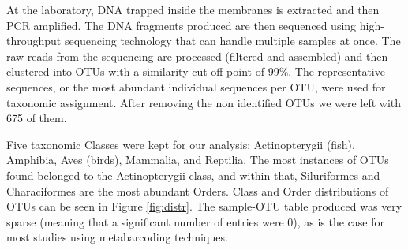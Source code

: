 At the laboratory, DNA trapped inside the membranes is extracted and then PCR amplified. The DNA fragments produced are then sequenced using high-throughput sequencing technology that can handle multiple samples at once. The raw reads from the sequencing are processed (filtered and assembled) and then clustered into OTUs with a similarity cut-off point of 99\%. The representative sequences, or the most abundant individual sequences per OTU, were used for taxonomic assignment. After removing the non identified OTUs we were left with 675 of them.

Five taxonomic Classes were kept for our analysis: Actinopterygii (fish), Amphibia, Aves (birds), Mammalia, and Reptilia. The most instances of OTUs found belonged to the Actinopterygii class, and within that, Siluriformes and Characiformes are the most abundant Orders. Class and Order distributions of OTUs can be seen in Figure \ref{fig:distr}. The sample-OTU table produced was very sparse (meaning that a significant number of entries were 0), as is the case for most studies using metabarcoding techniques. 
